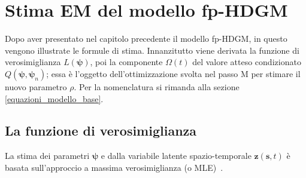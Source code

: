 \chapter[Stima EM del modello fp-HDGM]{Stima EM del modello fp-HDGM}

Dopo aver presentato nel capitolo precedente il modello fp-HDGM, in questo vengono illustrate le formule di stima. Innanzitutto viene derivata la funzione di verosimiglianza $L(\boldsymbol{\psi})$, poi la componente $\Omega(t)$ del valore atteso condizionato $Q(\boldsymbol{\psi}, \boldsymbol{\psi}_n)$; essa è l'oggetto dell'ottimizzazione svolta nel passo M per stimare il nuovo parametro $\rho$. Per la nomenclatura si rimanda alla sezione \ref{equazioni_modello_base}.

\section[La funzione di verosimiglianza]{La funzione di verosimiglianza}
La stima dei parametri $\boldsymbol{\psi}$ e dalla variabile latente spazio-temporale $\mathbf{z}(\mathbf{s}, t)$ è basata sull'approccio a massima verosimiglianza (o MLE)~\cite{paper_f_HDGM}.

